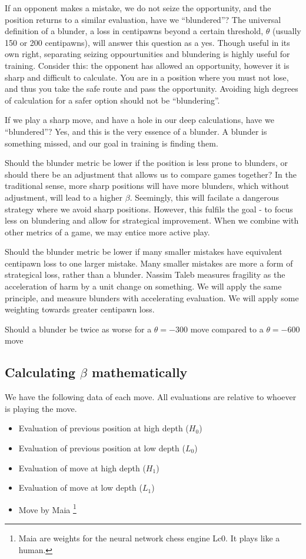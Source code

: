 \documentclass{article}
\begin{document}
If an opponent makes a mistake, we do not seize the opportunity, and the position returns to a similar evaluation, have we ``blundered''? The universal definition of a blunder, a loss in centipawns beyond a certain threshold, $\theta$ (usually 150 or 200 centipawns), will answer this question as a yes. Though useful in its own right, separating seizing oppourtunities and blundering is highly useful for training. Consider this: the opponent has allowed an opportunity, however it is sharp and difficult to calculate. You are in a position where you must not lose, and thus you take the safe route and pass the opportunity. Avoiding high degrees of calculation for a safer option should not be ``blundering''.

If we play a sharp move, and have a hole in our deep calculations, have we ``blundered''? Yes, and this is the very essence of a blunder. A blunder is something missed, and our goal in training is finding them.

Should the blunder metric be lower if the position is less prone to blunders, or should there be an adjustment that allows us to compare games together? In the traditional sense, more sharp positions will have more blunders, which without adjustment, will lead to a higher $\beta$. Seemingly, this will facilate a dangerous strategy where we avoid sharp positions. However, this fulfils the goal - to focus less on blundering and allow for strategical improvement. When we combine with other metrics of a game, we may entice more active play.

Should the blunder metric be lower if many smaller mistakes have equivalent centipawn loss to one larger mistake. Many smaller mistakes are more a form of strategical loss, rather than a blunder. Nassim Taleb measures fragility as the acceleration of harm by a unit change on something. We will apply the same principle, and measure blunders with accelerating evaluation. We will apply some weighting towards greater centipawn loss.

Should a blunder be twice as worse for a $\theta=-300$ move compared to a $\theta=-600$ move

\subsection{Calculating $\beta$ mathematically}
We have the following data of each move. All evaluations are relative to whoever is playing the move.
\begin{itemize}
  \item Evaluation of previous position at high depth ($H_0$)
  \item Evaluation of previous position at low depth ($L_0$)
  \item Evaluation of move at high depth ($H_1$)
  \item Evaluation of move at low depth ($L_1$)
  \item Move by Maia \footnote{Maia are weights for the neural network chess engine Lc0. It plays like a human.}
\end{itemize}
\end{document}
